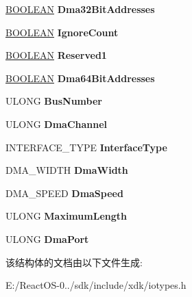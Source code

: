 \begin{DoxyCompactItemize}
\hyperlink{_processor_bind_8h_a112e3146cb38b6ee95e64d85842e380a}{B\+O\+O\+L\+E\+AN} {\bfseries Dma32\+Bit\+Addresses}
\item 
\mbox{\label{struct___d_e_v_i_c_e___d_e_s_c_r_i_p_t_i_o_n_a9f4b4658dc123af3884303347fc80890}} 
\hyperlink{_processor_bind_8h_a112e3146cb38b6ee95e64d85842e380a}{B\+O\+O\+L\+E\+AN} {\bfseries Ignore\+Count}
\item 
\mbox{\label{struct___d_e_v_i_c_e___d_e_s_c_r_i_p_t_i_o_n_ad8e7e5a3d2a543b027eac7d8ec524d4c}} 
\hyperlink{_processor_bind_8h_a112e3146cb38b6ee95e64d85842e380a}{B\+O\+O\+L\+E\+AN} {\bfseries Reserved1}
\item 
\mbox{\label{struct___d_e_v_i_c_e___d_e_s_c_r_i_p_t_i_o_n_a4044cfee5fb8151db4fddcf623efb8da}} 
\hyperlink{_processor_bind_8h_a112e3146cb38b6ee95e64d85842e380a}{B\+O\+O\+L\+E\+AN} {\bfseries Dma64\+Bit\+Addresses}
\item 
\mbox{\label{struct___d_e_v_i_c_e___d_e_s_c_r_i_p_t_i_o_n_a439324e5875bea572ec9ecb08d55a41e}} 
U\+L\+O\+NG {\bfseries Bus\+Number}
\item 
\mbox{\label{struct___d_e_v_i_c_e___d_e_s_c_r_i_p_t_i_o_n_a9c8c396e476186391c9668359e230b94}} 
U\+L\+O\+NG {\bfseries Dma\+Channel}
\item 
\mbox{\label{struct___d_e_v_i_c_e___d_e_s_c_r_i_p_t_i_o_n_ad37262a2a9a1e1844a7bc1c134ba5582}} 
I\+N\+T\+E\+R\+F\+A\+C\+E\+\_\+\+T\+Y\+PE {\bfseries Interface\+Type}
\item 
\mbox{\label{struct___d_e_v_i_c_e___d_e_s_c_r_i_p_t_i_o_n_ac7d3267fb71d2b0bec3f1ac86c3df3d7}} 
D\+M\+A\+\_\+\+W\+I\+D\+TH {\bfseries Dma\+Width}
\item 
\mbox{\label{struct___d_e_v_i_c_e___d_e_s_c_r_i_p_t_i_o_n_a4c0a13890d3857db74163c18d96fc3fc}} 
D\+M\+A\+\_\+\+S\+P\+E\+ED {\bfseries Dma\+Speed}
\item 
\mbox{\label{struct___d_e_v_i_c_e___d_e_s_c_r_i_p_t_i_o_n_ae866ede102c5ef43f960ca52c0c7e2a5}} 
U\+L\+O\+NG {\bfseries Maximum\+Length}
\item 
\mbox{\label{struct___d_e_v_i_c_e___d_e_s_c_r_i_p_t_i_o_n_a0ea2933c80461fe6dafcb97d515c6304}} 
U\+L\+O\+NG {\bfseries Dma\+Port}
\end{DoxyCompactItemize}


该结构体的文档由以下文件生成\+:\begin{DoxyCompactItemize}
\item 
E\+:/\+React\+O\+S-\/0../sdk/include/xdk/iotypes.\+h\end{DoxyCompactItemize}
